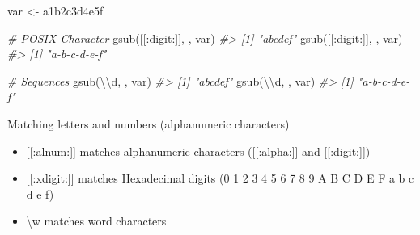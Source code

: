 \documentclass[
]{book}
\newenvironment{Shaded}{\begin{snugshade}}{\end{snugshade}}
\newcommand{\CommentTok}[1]{\textcolor[rgb]{0.56,0.35,0.01}{\textit{#1}}}
\newcommand{\FunctionTok}[1]{\textcolor[rgb]{0.00,0.00,0.00}{#1}}
\newcommand{\NormalTok}[1]{#1}
\newcommand{\OtherTok}[1]{\textcolor[rgb]{0.56,0.35,0.01}{#1}}
\newcommand{\SpecialCharTok}[1]{\textcolor[rgb]{0.00,0.00,0.00}{#1}}
\newcommand{\StringTok}[1]{\textcolor[rgb]{0.31,0.60,0.02}{#1}}
\providecommand{\tightlist}{%
  \setlength{\itemsep}{0pt}\setlength{\parskip}{0pt}}
\begin{document}
\begin{Shaded}
\begin{Highlighting}[]
\NormalTok{var }\OtherTok{\textless{}{-}} \StringTok{\textquotesingle{}a1b2c3d4e5f\textquotesingle{}}

\CommentTok{\# POSIX Character}
\FunctionTok{gsub}\NormalTok{(}\StringTok{\textquotesingle{}[[:digit:]]\textquotesingle{}}\NormalTok{, }\StringTok{\textquotesingle{}\textquotesingle{}}\NormalTok{, var)}
\CommentTok{\#\textgreater{} [1] "abcdef"}
\FunctionTok{gsub}\NormalTok{(}\StringTok{\textquotesingle{}[[:digit:]]\textquotesingle{}}\NormalTok{, }\StringTok{\textquotesingle{}{-}\textquotesingle{}}\NormalTok{, var)}
\CommentTok{\#\textgreater{} [1] "a{-}b{-}c{-}d{-}e{-}f"}

\CommentTok{\# Sequences}
\FunctionTok{gsub}\NormalTok{(}\StringTok{\textquotesingle{}}\SpecialCharTok{\textbackslash{}\textbackslash{}}\StringTok{d\textquotesingle{}}\NormalTok{, }\StringTok{\textquotesingle{}\textquotesingle{}}\NormalTok{, var)}
\CommentTok{\#\textgreater{} [1] "abcdef"}
\FunctionTok{gsub}\NormalTok{(}\StringTok{\textquotesingle{}}\SpecialCharTok{\textbackslash{}\textbackslash{}}\StringTok{d\textquotesingle{}}\NormalTok{, }\StringTok{\textquotesingle{}{-}\textquotesingle{}}\NormalTok{, var)}
\CommentTok{\#\textgreater{} [1] "a{-}b{-}c{-}d{-}e{-}f"}
\end{Highlighting}
\end{Shaded}

Matching letters and numbers (alphanumeric characters)

\begin{itemize}
\tightlist
\item
  {[}{[}:alnum:{]}{]} matches alphanumeric characters ({[}{[}:alpha:{]}{]} and {[}{[}:digit:{]}{]})
\item
  {[}{[}:xdigit:{]}{]} matches Hexadecimal digits (0 1 2 3 4 5 6 7 8 9 A B C D E F a b c d e f)
\item
  \textbackslash w matches word characters
\end{itemize}
\end{document}
